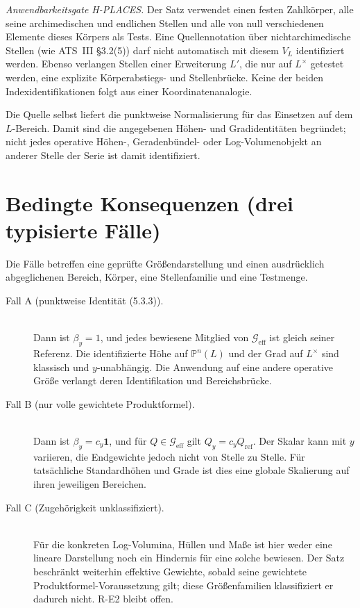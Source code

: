 \documentclass[11pt,a4paper]{article}
\theoremstyle{definition}
\theoremstyle{remark}
\newcommand{\Geff}{\mathcal{G}_{\mathrm{eff}}}
\begin{document}
\emph{Anwendbarkeitsgate H-PLACES.} Der Satz verwendet einen festen
Zahlkörper, alle seine archimedischen und endlichen Stellen und alle
von null verschiedenen Elemente dieses Körpers als Tests.
Eine Quellennotation über nichtarchimedische Stellen
(wie ATS~III \S3.2(5)) darf nicht automatisch mit diesem $V_L$
identifiziert werden. Ebenso verlangen Stellen einer Erweiterung $L'$,
die nur auf $L^\times$ getestet werden, eine explizite Körperabstiegs-
und Stellenbrücke. Keine der beiden Indexidentifikationen folgt aus
einer Koordinatenanalogie.

Die Quelle selbst liefert die punktweise Normalisierung für das Einsetzen
auf dem $L$-Bereich. Damit sind die angegebenen Höhen- und Gradidentitäten
begründet; nicht jedes operative Höhen-, Geradenbündel- oder
Log-Volumenobjekt an anderer Stelle der Serie ist damit identifiziert.

\section{Bedingte Konsequenzen (drei typisierte Fälle)}\label{sec:consequences}

Die Fälle betreffen eine geprüfte Größendarstellung und einen ausdrücklich
abgeglichenen Bereich, Körper, eine Stellenfamilie und eine Testmenge.
\begin{description}
\item[Fall A (punktweise Identität (5.3.3)).]\mbox{}\\
Dann ist $\beta_y=1$, und jedes bewiesene Mitglied von $\Geff$ ist gleich
seiner Referenz. Die identifizierte Höhe auf $\mathbb P^n(L)$ und der Grad
auf $L^\times$ sind klassisch und $y$-unabhängig.
Die Anwendung auf eine andere operative Größe verlangt deren
Identifikation und Bereichsbrücke.
\item[Fall B (nur volle gewichtete Produktformel).]\mbox{}\\
Dann ist $\beta_y=c_y\mathbf1$, und für $Q\in\Geff$ gilt
$Q_y=c_yQ_{\mathrm{ref}}$. Der Skalar kann mit $y$ variieren,
die Endgewichte jedoch nicht von Stelle zu Stelle.
Für tatsächliche Standardhöhen und Grade ist dies eine globale
Skalierung auf ihren jeweiligen Bereichen.
\item[Fall C (Zugehörigkeit unklassifiziert).]\mbox{}\\
Für die konkreten Log-Volumina, Hüllen und Maße ist hier weder eine lineare
Darstellung noch ein Hindernis für eine solche bewiesen.
Der Satz beschränkt weiterhin effektive Gewichte, sobald seine
gewichtete Produktformel-Voraussetzung gilt; diese Größenfamilien
klassifiziert er dadurch nicht. R-E2 bleibt offen.
\end{description}
\end{document}
